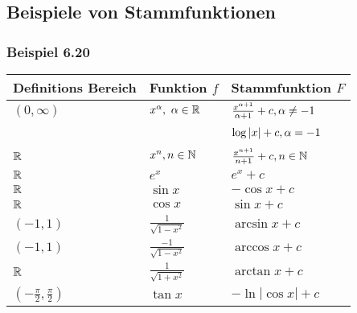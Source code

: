 \subsection*{Beispiele von Stammfunktionen}
\subsubsection*{Beispiel 6.20}
\renewcommand{\arraystretch}{1.5}
\begin{tabularx}{\textwidth}{|Y|Y|Y|}
\hline
    Definitions Bereich & Funktion $f$                          & Stammfunktion $F$                                                      \\\hline\hline
    $(0,\infty)$        & $x^\alpha,\text{ }\alpha\in\mathbb{R}$ & $\frac{{{x^{\alpha  + 1}}}}{{\alpha  + 1}} + c,{\rm{ }}\alpha  \ne  - 1$ \\ [1.5ex]
    ~                   & ~                                     & $\log \left| x \right| + c,{\rm{ }}\alpha  =  - 1$                       \\[1.5ex]\hline
    $\mathbb{R}$        & $x^n, n\in\mathbb{N}$                 & $\frac{{{x^{n + 1}}}}{{n + 1}} + c,{\rm{ }}n \in \mathbb{N}$             \\[1.5ex]\hline
    $\mathbb{R}$        & ${e^x}$                             & ${e^x}+c$                                                                \\ [1.5ex]\hline
    $\mathbb{R}$        & $\sin{x}$                             & $-\cos{x}+c$                                                                \\ [1.5ex]\hline
$\mathbb{R}$        & $\cos{x}$                             & $\sin{x}+c$                                                                \\ [1.5ex]\hline
$(-1,1)$        & $\frac{1}{\sqrt{1-x^2}}$                             & $\arcsin{x}+c$                                                                \\ [1.5ex]\hline
$(-1,1)$        & $\frac{-1}{\sqrt{1-x^2}}$                             & $\arccos{x}+c$                                                                \\ [1.5ex]\hline
$\mathbb{R}$        & $\frac{1}{\sqrt{1+x^2}}$                             & $\arctan{x}+c$                                                                \\ [1.5ex]\hline
$(-\frac{\pi}{2},\frac{\pi}{2})$        & $\tan{x}$                             & $- \ln \left| {\cos x} \right| + c$                                                                \\ [1.5ex]\hline

\end{tabularx}
